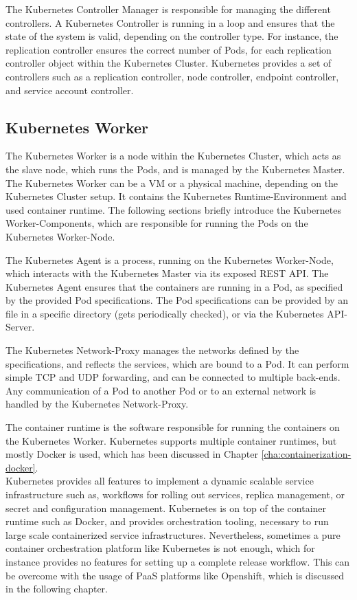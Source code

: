 The Kubernetes Controller Manager is responsible for managing the different controllers. A Kubernetes Controller is running in a loop and ensures that the state of the system is valid, depending on the controller type. For instance, the replication controller ensures the correct number of Pods, for each replication controller object  within the Kubernetes Cluster. Kubernetes provides a set of controllers such as a replication controller, node controller, endpoint controller, and service account controller.

\subsection{Kubernetes Worker}
\label{sec:caas-kubernetes-worker}
The Kubernetes Worker is a node within the Kubernetes Cluster, which acts as the slave node, which runs the Pods, and is managed by the Kubernetes Master. The Kubernetes Worker can be a VM or a physical machine, depending on the Kubernetes Cluster setup. It contains the Kubernetes Runtime-Environment and used container runtime. The following sections briefly introduce the Kubernetes Worker-Components, which are responsible for running the Pods on the Kubernetes Worker-Node\cite{CNCFKubernetesComponents2018}. 

The Kubernetes Agent is a process, running on the Kubernetes Worker-Node, which interacts with the Kubernetes Master via its exposed REST API. The Kubernetes Agent ensures that the containers are running in a Pod, as specified by the provided Pod specifications. The Pod specifications can be provided by an file in a specific directory (gets periodically checked), or via the Kubernetes API-Server.

The Kubernetes Network-Proxy manages the networks defined by the specifications, and reflects the services, which are bound to a Pod. It can perform simple TCP and UDP forwarding, and can be connected to multiple back-ends. Any communication of a Pod to another Pod or to an external network is handled by the Kubernetes Network-Proxy. 

The container runtime is the software responsible for running the containers on the Kubernetes Worker. Kubernetes supports multiple container runtimes, but mostly  Docker is used, which has been discussed in Chapter \vref{cha:containerization-docker}. \\

Kubernetes provides all features to implement a dynamic scalable service infrastructure such as, workflows for rolling out services, replica management, or secret and configuration management. Kubernetes is on top of the container runtime such as Docker, and provides orchestration tooling, necessary to run large scale containerized service infrastructures. Nevertheless, sometimes a pure container orchestration platform like Kubernetes is not enough, which for instance provides no features for setting up a complete release workflow. This can be overcome with the usage of PaaS platforms like Openshift, which is discussed in the following chapter.
